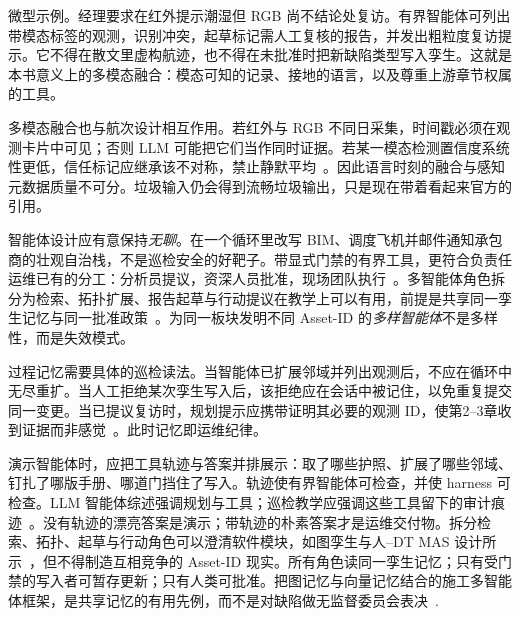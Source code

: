 微型示例。经理要求在红外提示潮湿但 RGB 尚不结论处复访。有界智能体可列出带模态标签的观测，识别冲突，起草标记需人工复核的报告，并发出粗粒度复访提示。它不得在散文里虚构航迹，也不得在未批准时把新缺陷类型写入孪生。这就是本书意义上的多模态融合：模态可知的记录、接地的语言，以及尊重上游章节权属的工具。

多模态融合也与航次设计相互作用。若红外与 RGB 不同日采集，时间戳必须在观测卡片中可见；否则 LLM 可能把它们当作同时证据。若某一模态检测置信度系统性更低，信任标记应继承该不对称，禁止静默平均~\cite{zhao2024facade,zhao2026physical}。因此语言时刻的融合与感知元数据质量不可分。垃圾输入仍会得到流畅垃圾输出，只是现在带着看起来官方的引用。

智能体设计应有意保持\emph{无聊}。在一个循环里改写 BIM、调度飞机并邮件通知承包商的壮观自治栈，不是巡检安全的好靶子。带显式门禁的有界工具，更符合负责任运维已有的分工：分析员提议，资深人员批准，现场团队执行~\cite{luo2025llmdtrobot,gao2026ifcagent,zhang2025llmagentschema}。多智能体角色拆分为检索、拓扑扩展、报告起草与行动提议在教学上可以有用，前提是共享同一孪生记忆与同一批准政策~\cite{wang2024surveyagents,li2024surveymultiagent,rawat2025llmmas}。为同一板块发明不同 Asset-ID 的\emph{多样智能体}不是多样性，而是失效模式。

过程记忆需要具体的巡检读法。当智能体已扩展邻域并列出观测后，不应在循环中无尽重扩。当人工拒绝某次孪生写入后，该拒绝应在会话中被记住，以免重复提交同一变更。当已提议复访时，规划提示应携带证明其必要的观测 ID，使第2--3章收到证据而非感觉~\cite{yao2023react,rawat2025llmmas}。此时记忆即运维纪律。



演示智能体时，应把工具轨迹与答案并排展示：取了哪些护照、扩展了哪些邻域、钉扎了哪版手册、哪道门挡住了写入。轨迹使有界智能体可检查，并使 harness 可检查。LLM 智能体综述强调规划与工具；巡检教学应强调这些工具留下的审计痕迹~\cite{wang2024surveyagents,li2024surveymultiagent,yao2023react,schick2023toolformer,liang2023helm}。没有轨迹的漂亮答案是演示；带轨迹的朴素答案才是运维交付物。拆分检索、拓扑、起草与行动角色可以澄清软件模块，如图孪生与人--DT MAS 设计所示~\cite{pan2026graphdtgpt,lu2026highwaymas}，但不得制造互相竞争的 Asset-ID 现实。所有角色读同一孪生记忆；只有受门禁的写入者可暂存更新；只有人类可批准。把图记忆与向量记忆结合的施工多智能体框架，是共享记忆的有用先例，而不是对缺陷做无监督委员会表决~\cite{rawat2025llmmas,gao2026ifcagent,luo2025llmdtrobot}.

